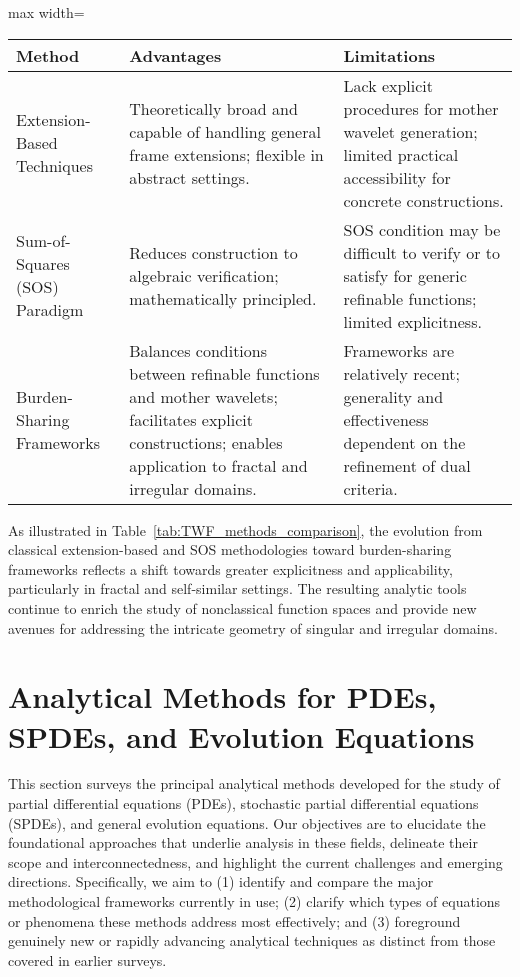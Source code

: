 \documentclass[sigconf]{acmart}
\begin{document}
\begin{table*}[htbp]
\centering
\caption{Comparison of Construction Methods for Tight Wavelet Frames (TWFs)}
\label{tab:TWF_methods_comparison}
\begin{adjustbox}{max width=\textwidth}
\begin{tabular}{lll}
\toprule
\textbf{Method} & \textbf{Advantages} & \textbf{Limitations} \\
\midrule
Extension-Based Techniques & Theoretically broad and capable of handling general frame extensions; flexible in abstract settings. & Lack explicit procedures for mother wavelet generation; limited practical accessibility for concrete constructions. \\
Sum-of-Squares (SOS) Paradigm & Reduces construction to algebraic verification; mathematically principled. & SOS condition may be difficult to verify or to satisfy for generic refinable functions; limited explicitness. \\
Burden-Sharing Frameworks & Balances conditions between refinable functions and mother wavelets; facilitates explicit constructions; enables application to fractal and irregular domains. & Frameworks are relatively recent; generality and effectiveness dependent on the refinement of dual criteria. \\
\bottomrule
\end{tabular}
\end{adjustbox}
\end{table*}

As illustrated in Table~\ref{tab:TWF_methods_comparison}, the evolution from classical extension-based and SOS methodologies toward burden-sharing frameworks reflects a shift towards greater explicitness and applicability, particularly in fractal and self-similar settings. The resulting analytic tools continue to enrich the study of nonclassical function spaces and provide new avenues for addressing the intricate geometry of singular and irregular domains.

\section{Analytical Methods for PDEs, SPDEs, and Evolution Equations}

This section surveys the principal analytical methods developed for the study of partial differential equations (PDEs), stochastic partial differential equations (SPDEs), and general evolution equations. Our objectives are to elucidate the foundational approaches that underlie analysis in these fields, delineate their scope and interconnectedness, and highlight the current challenges and emerging directions. Specifically, we aim to (1) identify and compare the major methodological frameworks currently in use; (2) clarify which types of equations or phenomena these methods address most effectively; and (3) foreground genuinely new or rapidly advancing analytical techniques as distinct from those covered in earlier surveys. 
\end{document}
